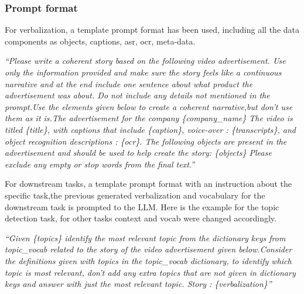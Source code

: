 \documentclass[hidelinks,11pt,a4paper]{report}
\begin{document}
\subsubsection{Prompt format} 
\label{sec:prompt-format}
 For verbalization, a template prompt format has been used, including all the data components as objects, captions, asr, ocr, meta-data. 

\textit{``Please write a coherent story based on the following video advertisement. Use only the information provided and make sure the story feels like a continuous narrative and at the end include one sentence about what product the advertisement was about. Do not include any details not mentioned in the prompt.Use the elements given below to create a coherent narrative,but don't use them as it is.The advertisement for the company \{company\_name\} The video is titled \{title\}, with captions that include \{caption\}, voice-over : \{transcripts\}, and object recognition descriptions : \{ocr\}. The following objects are present in the advertisement and should be used to help create the story: \{objects\} Please exclude any empty or stop words from the final text.''}

For downstream tasks, a template prompt format with an instruction about the specific task,the previous generated verbalization and vocabulary for the downstream task is prompted to the LLM. Here is the example for the topic detection task, for other tasks context and vocab were changed accordingly.

\textit{``Given \{topics\} identify the most relevant topic from the dictionary keys from topic\_vocab related to the story of the video advertisement given below.Consider the definitions given with topics in the topic\_vocab dictionary, to identify which topic is most relevant, don't add any extra topics that are not given in dictionary keys and answer with just the most relevant topic. Story : \{verbalization\}''}
\end{document}

